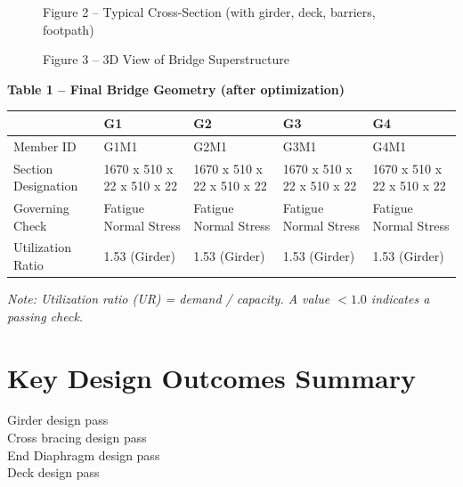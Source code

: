 \documentclass[12pt,a4paper]{report}
\numberwithin{table}{chapter}
\numberwithin{figure}{chapter}
\begin{document}
\newpage

\begin{figure}[H]
\centering
{}
\caption*{Figure 2 -- Typical Cross-Section (with girder, deck, barriers, footpath)}
\end{figure}

\begin{figure}[H]
\centering
{}
\caption*{Figure 3 -- 3D View of Bridge Superstructure}
\end{figure}

\noindent\textbf{Table 1 -- Final Bridge Geometry (after optimization)}

\vspace{0.4em}
\noindent
\begin{tabular}{|C{2.8cm}|C{3.0cm}|C{3.0cm}|C{3.0cm}|C{3.0cm}|}
\hline
  \textbf{} &
  \textbf{G1} &
  \textbf{G2} &
  \textbf{G3} &
  \textbf{G4} \\
\hline
Member ID & G1M1 & G2M1 & G3M1 & G4M1 \\
\hline
Section Designation & 1670 x 510 x 22 x 510 x 22 & 1670 x 510 x 22 x 510 x 22 & 1670 x 510 x 22 x 510 x 22 & 1670 x 510 x 22 x 510 x 22 \\
\hline
Governing Check & Fatigue Normal Stress & Fatigue Normal Stress & Fatigue Normal Stress & Fatigue Normal Stress \\
\hline
Utilization Ratio & 1.53 (Girder) & 1.53 (Girder) & 1.53 (Girder) & 1.53 (Girder) \\
\hline
\end{tabular}

\vspace{0.4em}
\noindent\textit{Note: Utilization ratio (UR) = demand / capacity. A value $< 1.0$ indicates a passing check.}

\vspace{1em}

\section*{Key Design Outcomes Summary}
\label{sec:key-outcomes}

\noindent Girder design pass \\
Cross bracing design pass \\
End Diaphragm design pass \\
Deck design pass
\end{document}
